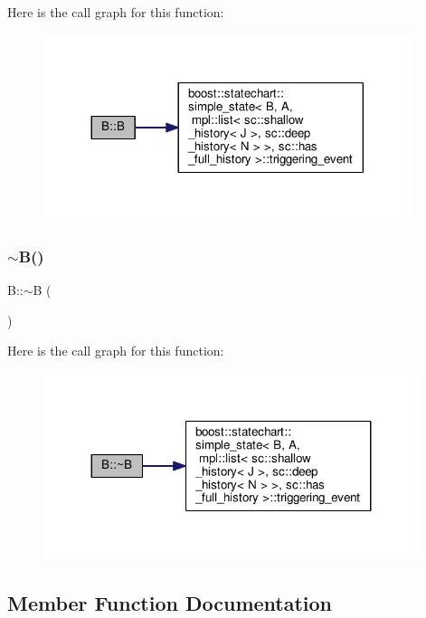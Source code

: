 Here is the call graph for this function\+:
\nopagebreak
\begin{figure}[H]
\begin{center}
\leavevmode
\includegraphics[width=305pt]{struct_b_a8d6359453d0d6206098cf1980b6c7495_cgraph}
\end{center}
\end{figure}
\mbox{\label{struct_b_abf3bb815dcba0116aee6f0e87d694702}} 
\subsubsection{\texorpdfstring{$\sim$\+B()}{~B()}}
{\footnotesize\ttfamily B\+::$\sim$B (\begin{DoxyParamCaption}{ }\end{DoxyParamCaption})\hspace{0.3cm}{\ttfamily [inline]}}

Here is the call graph for this function\+:
\nopagebreak
\begin{figure}[H]
\begin{center}
\leavevmode
\includegraphics[width=311pt]{struct_b_abf3bb815dcba0116aee6f0e87d694702_cgraph}
\end{center}
\end{figure}


\subsection{Member Function Documentation}
\mbox{\label{struct_b_ad8417b0b86326962007c13d75094330e}} 

